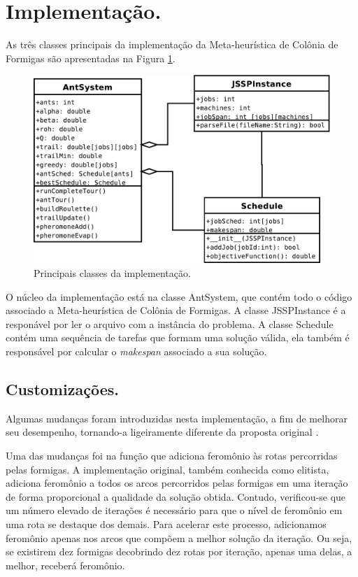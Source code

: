 \section{Implementação.}
As três classes principais da implementação da Meta-heurística de Colônia de Formigas são apresentadas
na Figura \ref{fig:modelo_aep}.

\begin{figure}[ht]
  \centering
  \includegraphics[scale=0.4]{./fig/modelo_aep.pdf}
  \caption{Principais classes da implementação.}
  \label{fig:modelo_aep}
\end{figure}

O núcleo da implementação está na classe AntSystem, que contém todo o código associado a Meta-heurística
de Colônia de Formigas.
A classe JSSPInstance é a responável por ler o arquivo com a instância do problema. A classe Schedule
contém uma sequência de tarefas que formam uma solução válida, ela também é responsável por calcular
o \textit{makespan} associado a sua solução.


\subsection{Customizações.}
Algumas mudanças foram introduzidas nesta implementação, a fim de melhorar seu desempenho,
tornando-a ligeiramente diferente da proposta original \cite{colorni1994ant}.

Uma das mudanças foi na função que adiciona feromônio às rotas percorridas pelas formigas. A implementação
original, também conhecida como elitista, adiciona feromônio a todos os arcos percorridos pelas formigas em 
uma iteração de forma proporcional a qualidade da solução obtida. Contudo, verificou-se que um número elevado
de iterações é necessário para que o nível de feromônio em uma rota se destaque dos demais. Para acelerar este 
processo, adicionamos feromônio apenas nos arcos que compõem a melhor solução da iteração. Ou seja, se existirem
dez formigas decobrindo dez rotas por iteração, apenas uma delas, a melhor, receberá feromônio.

